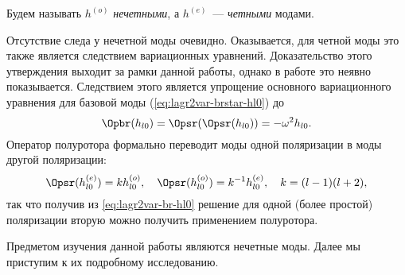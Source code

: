 \documentclass[\docroot/reports/draft/report.tex]{subfiles}
\begin{document}
    Будем называть $h^{(o)}$ \textit{нечетными}, а $h^{(e)}$~--- \textit{четными} модами.

    Отсутствие следа у нечетной моды очевидно. Оказывается, для четной моды это также является следствием вариационных уравнений. Доказательство этого утверждения выходит за рамки данной работы, однако в работе  это неявно показывается. Следствием этого является упрощение основного вариационного уравнения для базовой моды (\autoref{eq:lagr2var-brstar-hl0}) до
    \begin{equation}\label{eq:lagr2var-br-hl0}
        \Opbr(h_{l0}) = \Opsr(\Opsr(h_{l0})) = - \omega^2 h_{l0} .
    \end{equation}
    Оператор полуротора формально переводит моды одной поляризации в моды другой поляризации:
    \begin{equation}\label{eq:sr-he-ho}
        \Opsr(h_{l0}^{(e)}) = k h_{l0}^{(o)}, \quad \Opsr(h_{l0}^{(o)}) = k^{-1} h_{l0}^{(e)}, \quad k = (l-1)(l+2) ,
    \end{equation}
    так что получив из \autoref{eq:lagr2var-br-hl0} решение для одной (более простой) поляризации вторую можно получить применением полуротора.

    Предметом изучения данной работы являются нечетные моды. Далее мы приступим к их подробному исследованию.


\end{document}
